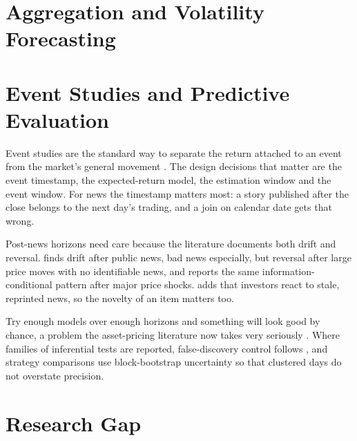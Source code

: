 \documentclass[11pt,a4paper,oneside]{book}
\let\textcite\citet
\let\Textcite\Citet
\let\parencite\citep
\newif\ifshowdraftnotes
\newcommand{\draftnote}[1]{%
  \ifshowdraftnotes
    \par\smallskip
    \noindent{\color{draftgrey}\small\itshape Drafting note: #1\par}
    \smallskip
  \fi
}
\begin{document}
\section{Aggregation and Volatility Forecasting}
\label{sec:lit-aggregation}

\draftnote{New section. Cover (1) how the empirical literature aggregates multiple same-day stories, and how rarely the choice is examined; (2) negative-news asymmetry as a reason to expect the informative part in the negative tail; (3) HAR realised-volatility forecasting \parencite{corsi2009har} and volatility targeting as the independent base the risk translation builds on. Add the missing references to \texttt{references.bib}.}

\section{Event Studies and Predictive Evaluation}
\label{sec:lit-event-studies}

Event studies are the standard way to separate the return attached to an event from the market's general movement \parencite{mackinlay1997event}.
The design decisions that matter are the event timestamp, the expected-return model, the estimation window and the event window.
For news the timestamp matters most: a story published after the close belongs to the next day's trading, and a join on calendar date gets that wrong.

Post-news horizons need care because the literature documents both drift and reversal.
\Textcite{chan2003news} finds drift after public news, bad news especially, but reversal after large price moves with no identifiable news, and \textcite{savor2012information} reports the same information-conditional pattern after major price shocks.
\Textcite{tetlock2011stale} adds that investors react to stale, reprinted news, so the novelty of an item matters too.

Try enough models over enough horizons and something will look good by chance, a problem the asset-pricing literature now takes very seriously \parencite{harvey2016multiple}.
Where families of inferential tests are reported, false-discovery control follows \textcite{benjamini1995fdr}, and strategy comparisons use block-bootstrap uncertainty so that clustered days do not overstate precision.

\section{Research Gap}
\label{sec:lit-gap}
\end{document}
